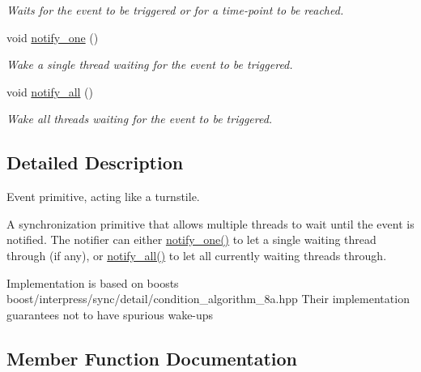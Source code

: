 \begin{DoxyCompactItemize}
\begin{DoxyCompactList}\small\item\em Waits for the event to be triggered or for a time-\/point to be reached. \end{DoxyCompactList}\item 
void \hyperlink{classcpen333_1_1thread_1_1event_a453552a68dff5c45321496e452495364}{notify\+\_\+one} ()
\begin{DoxyCompactList}\small\item\em Wake a single thread waiting for the event to be triggered. \end{DoxyCompactList}\item 
void \hyperlink{classcpen333_1_1thread_1_1event_ac41756fc84760cd537c78de31b3b25fa}{notify\+\_\+all} ()
\begin{DoxyCompactList}\small\item\em Wake all threads waiting for the event to be triggered. \end{DoxyCompactList}\end{DoxyCompactItemize}


\subsection{Detailed Description}
Event primitive, acting like a turnstile. 

A synchronization primitive that allows multiple threads to wait until the event is notified. The notifier can either {\ttfamily \hyperlink{classcpen333_1_1thread_1_1event_a453552a68dff5c45321496e452495364}{notify\+\_\+one()}} to let a single waiting thread through (if any), or {\ttfamily \hyperlink{classcpen333_1_1thread_1_1event_ac41756fc84760cd537c78de31b3b25fa}{notify\+\_\+all()}} to let all currently waiting threads through.

Implementation is based on boost\textquotesingle{}s boost/interpress/sync/detail/condition\+\_\+algorithm\+\_\+8a.\+hpp Their implementation guarantees not to have spurious wake-\/ups 

\subsection{Member Function Documentation}
\mbox{\label{classcpen333_1_1thread_1_1event_ac41756fc84760cd537c78de31b3b25fa}} 
